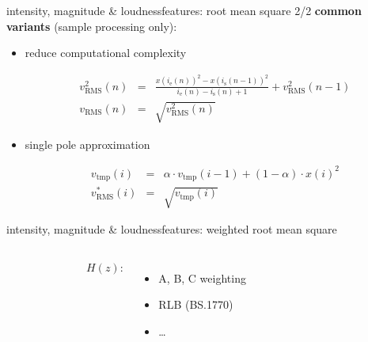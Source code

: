         \begin{frame}{intensity, magnitude \& loudness}{features: root mean square 2/2}
                \textbf{common variants}  (sample processing only):
                \begin{itemize}
                    \item<1->	reduce computational complexity
                        \begin{footnotesize}
                        \begin{eqnarray*}
                            v^2_{\mathrm{RMS}}(n) &=& \frac{x(i_{\mathrm{e}}(n))^2 - x(i_{\mathrm{s}}(n-1))^2}{i_{\mathrm{e}}(n)-i_{\mathrm{s}}(n) + 1} + v^2_{\mathrm{RMS}}(n-1) \\
                            v_{\mathrm{RMS}}(n)	&=& \sqrt{v^2_{\mathrm{RMS}}(n)}
                        \end{eqnarray*}
                        \end{footnotesize}
                    \smallskip
                    \item<2->	single pole approximation
                        \begin{footnotesize}
                        \begin{eqnarray*}
                            v_\mathrm{tmp}(i)	&=& \alpha\cdot v_\mathrm{tmp}(i-1) + (1-\alpha)\cdot x(i)^2\\
                            v^*_{\mathrm{RMS}}(i)		&=& \sqrt{v_\mathrm{tmp}(i)}
                        \end{eqnarray*}
                        \end{footnotesize}
                \end{itemize}
        \end{frame}
        \begin{frame}{intensity, magnitude \& loudness}{features: weighted root mean square}
            \begin{columns}
                \vspace{-8mm}
                \begin{figure}
                    \centering
                    
                \end{figure}
            $H(z)$:
            \begin{itemize}
                \item	A, B, C weighting
                \item	RLB (BS.1770)
                \item	\ldots
            \end{itemize}
            \end{columns}
            \vspace{-3mm}
            
        \end{frame}

